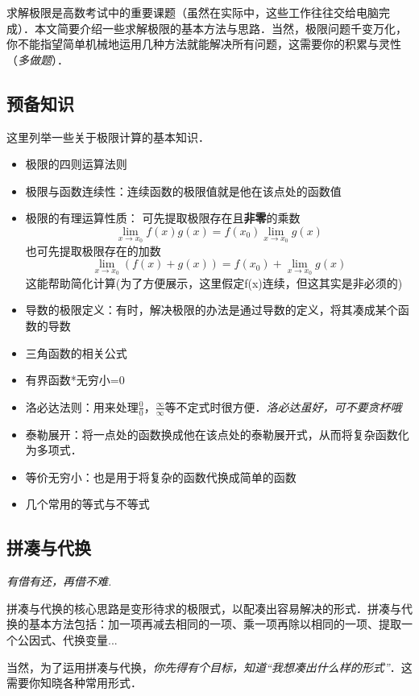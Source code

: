 
\begin{issues}
\issueDraft
\end{issues}

求解极限是高数考试中的重要课题（虽然在实际中，这些工作往往交给电脑完成）．本文简要介绍一些求解极限的基本方法与思路．当然，极限问题千变万化，你不能指望简单机械地运用几种方法就能解决所有问题，这需要你的积累与灵性（\textsl{多做题}）．

\subsection{预备知识}
这里列举一些关于极限计算的基本知识．
\begin{itemize}
\item 极限的四则运算法则
\item 极限与函数连续性：连续函数的极限值就是他在该点处的函数值
\item 极限的有理运算性质：
可先提取极限存在且\textbf{非零}的乘数 
$$\lim_{x\to x_0} f(x)g(x) = f(x_0)\lim_{x\to x_0} g(x)$$
也可先提取极限存在的加数
$$\lim_{x\to x_0} (f(x)+g(x)) = f(x_0)+\lim_{x\to x_0} g(x)$$
这能帮助简化计算(为了方便展示，这里假定f(x)连续，但这其实是非必须的)
\item 导数的极限定义：有时，解决极限的办法是通过导数的定义，将其凑成某个函数的导数
\item 三角函数的相关公式
\item 有界函数*无穷小=0
\item 洛必达法则：用来处理$\frac{0}{0}$，$\frac{\infty}{\infty}$等不定式时很方便．\textsl{洛必达虽好，可不要贪杯哦}
\item 泰勒展开：将一点处的函数换成他在该点处的泰勒展开式，从而将复杂函数化为多项式．
\item 等价无穷小：也是用于将复杂的函数代换成简单的函数
\item 几个常用的等式与不等式
\end{itemize}

\subsection{拼凑与代换}
\textsl{有借有还，再借不难.}

拼凑与代换的核心思路是变形待求的极限式，以配凑出容易解决的形式．拼凑与代换的基本方法包括：加一项再减去相同的一项、乘一项再除以相同的一项、提取一个公因式、代换变量...

当然，为了运用拼凑与代换，\textsl{你先得有个目标，知道“我想凑出什么样的形式”}．这需要你知晓各种常用形式．

